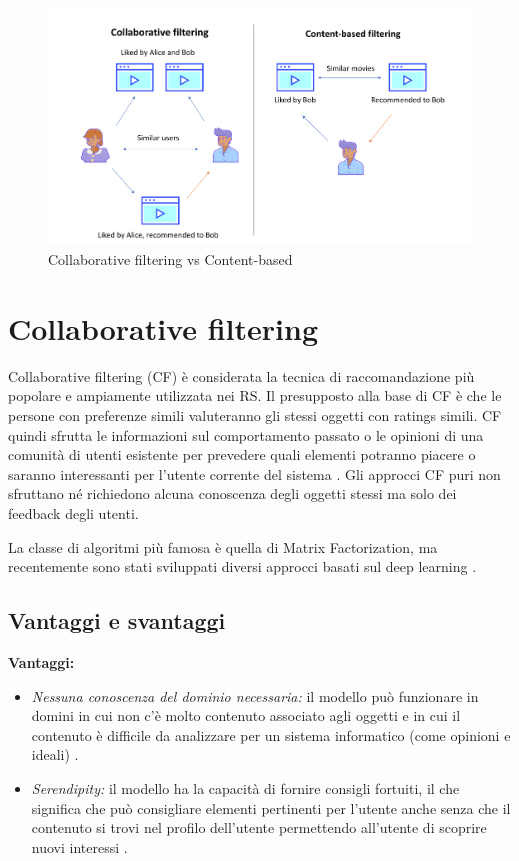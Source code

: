 \documentclass[12pt,italian]{report}
\begin{document}
\begin{figure}
  \includegraphics[width=\linewidth]{immagini/cb_cf_schema.png}
  \caption{Collaborative filtering vs Content-based}
  \label{fig:cb-cf}
\end{figure}



\section{Collaborative filtering}
Collaborative filtering (CF) è considerata la tecnica di raccomandazione più popolare e ampiamente utilizzata nei RS. Il presupposto alla base di CF è che le persone con preferenze simili valuteranno gli stessi oggetti con ratings simili. CF quindi sfrutta le informazioni sul comportamento passato o le opinioni di una comunità di utenti esistente per prevedere quali elementi potranno piacere o saranno interessanti per l'utente corrente del sistema \cite{recsys-intro}. Gli approcci CF puri non sfruttano né richiedono alcuna conoscenza degli oggetti stessi ma solo dei feedback degli utenti.

La classe di algoritmi più famosa è quella di Matrix Factorization, ma recentemente sono stati sviluppati diversi approcci basati sul deep learning \cite{deep-learning-survey}.

\subsection{Vantaggi e svantaggi} \label{ssec:pros-cons-cf}
\textbf{Vantaggi:}
\begin{itemize}

 \item \textit{Nessuna conoscenza del dominio necessaria:} il modello può funzionare in domini in cui non c'è molto contenuto associato agli oggetti e in cui il contenuto è difficile da analizzare per un sistema informatico (come opinioni e ideali) \cite{recsys-principle-methods-evaluation}.
 
 \item \textit{Serendipity:} il modello ha la capacità di fornire consigli fortuiti, il che significa che può consigliare elementi pertinenti per l'utente anche senza che il contenuto si trovi nel profilo dell'utente permettendo all'utente di scoprire nuovi interessi \cite{recsys-principle-methods-evaluation} \cite{cf-advantages-google}.
\end{itemize}
\end{document}
